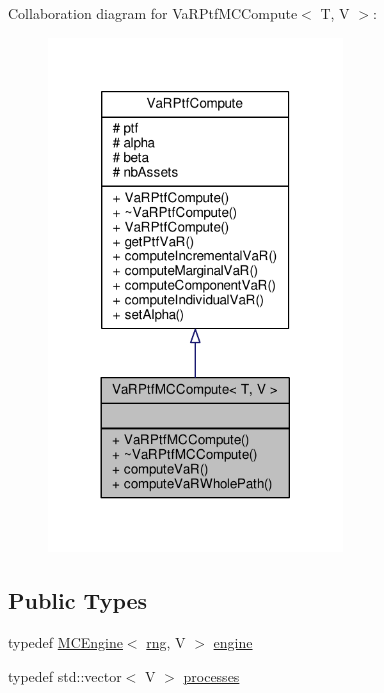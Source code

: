 Collaboration diagram for Va\+R\+Ptf\+M\+C\+Compute$<$ T, V $>$\+:
\nopagebreak
\begin{figure}[H]
\begin{center}
\leavevmode
\includegraphics[width=221pt]{classVaRPtfMCCompute__coll__graph}
\end{center}
\end{figure}
\subsection*{Public Types}
\begin{DoxyCompactItemize}
\item 
typedef \hyperlink{classMCEngine}{M\+C\+Engine}$<$ \hyperlink{classrng}{rng}, V $>$ \hyperlink{classVaRPtfMCCompute_a77b17bb3264e1b7e90485290d84f9ed0}{engine}
\item 
typedef std\+::vector$<$ V $>$ \hyperlink{classVaRPtfMCCompute_a019d051e785efc490f2428be67bfb752}{processes}
\end{DoxyCompactItemize}
